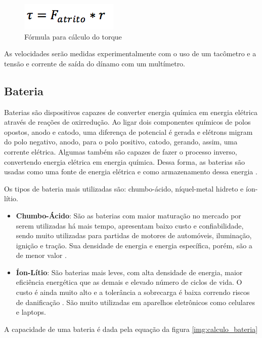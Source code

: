 \graphicspath{{figuras/}}
\begin{figure}[h!]
\centering
\includegraphics[scale=1.0]{torque}
\caption{Fórmula para cálculo do torque}
\label{img:torque}
\end{figure}


As velocidades serão medidas experimentalmente com o uso de um tacômetro e a tensão e corrente de saída do dínamo com um multímetro.
  
\subsection{Bateria}
	Baterias são dispositivos capazes de converter energia química em energia elétrica através de reações de oxirredução. Ao ligar dois componentes químicos de polos opostos, anodo e catodo, uma diferença de potencial é gerada e elétrons migram do polo negativo, anodo, para o polo positivo, catodo, gerando, assim, uma corrente elétrica. Algumas também são capazes de fazer o processo inverso, convertendo energia elétrica em energia química. Dessa forma, as baterias são usadas como uma fonte de energia elétrica e como armazenamento dessa energia \cite{varela}.
	
	Os tipos de bateria mais utilizadas são: chumbo-ácido, níquel-metal hidreto e íon-lítio.
	
	\begin{itemize}
		\item \textbf{Chumbo-Ácido}: São as baterias com maior maturação no mercado por serem utilizadas há mais tempo, apresentam baixo custo e confiabilidade, sendo muito utilizadas para partidas de motores de automóveis, iluminação, ignição e tração. Sua densidade de energia e energia específica, porém, são a de menor valor \cite{bezerra}.
	\item \textbf{Íon-Lítio}:  São baterias mais leves, com alta densidade de energia, maior eficiência energética que as demais e elevado número de ciclos de vida. O custo é ainda muito alto e a tolerância a sobrecarga é baixa correndo riscos de danificação \cite{bezerra}. São muito utilizadas em aparelhos eletrônicos como celulares e laptops.
	\end{itemize}
	
	A capacidade de uma bateria é dada pela equação da figura \ref{img:calculo_bateria}
	
